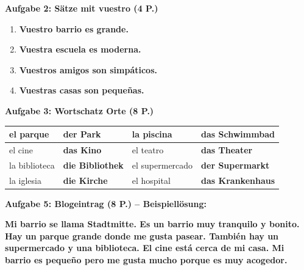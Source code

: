 \documentclass[11pt,a4paper]{article}
\newcommand{\lsg}[1]{\textcolor{loesung}{\textbf{#1}}}
\begin{document}
\begin{gruppenbox}
\textbf{Aufgabe 2: Sätze mit vuestro (4 P.)}
\begin{enumerate}[label=\alph*), leftmargin=2em, nosep]
    \item \lsg{Vuestro barrio es grande.}
    \item \lsg{Vuestra escuela es moderna.}
    \item \lsg{Vuestros amigos son simpáticos.}
    \item \lsg{Vuestras casas son pequeñas.}
\end{enumerate}

\vspace{0.5em}

\textbf{Aufgabe 3: Wortschatz Orte (8 P.)}

\begin{tabularx}{\textwidth}{@{}|X|X|X|X|@{}}
\hline
el parque & \lsg{der Park} & la piscina & \lsg{das Schwimmbad} \\
\hline
el cine & \lsg{das Kino} & el teatro & \lsg{das Theater} \\
\hline
la biblioteca & \lsg{die Bibliothek} & el supermercado & \lsg{der Supermarkt} \\
\hline
la iglesia & \lsg{die Kirche} & el hospital & \lsg{das Krankenhaus} \\
\hline
\end{tabularx}

\vspace{0.5em}

\textbf{Aufgabe 5: Blogeintrag (8 P.) -- Beispiellösung:}

\lsg{Mi barrio se llama Stadtmitte. Es un barrio muy tranquilo y bonito. Hay un parque grande donde me gusta pasear. También hay un supermercado y una biblioteca. El cine está cerca de mi casa. Mi barrio es pequeño pero me gusta mucho porque es muy acogedor.}

\end{gruppenbox}

\vspace{1em}
\end{document}
